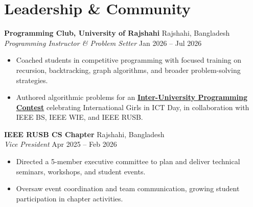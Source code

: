 \documentclass[letterpaper,10pt]{article}
\newcommand{\entrygap}{\vspace{3pt}}
\begin{document}
\section*{Leadership \& Community}
\textbf{Programming Club, University of Rajshahi} \hfill Rajshahi, Bangladesh \\
\textit{Programming Instructor \& Problem Setter} \hfill Jan 2026 -- Jul 2026
\begin{itemize}
    \item Coached students in competitive programming with focused training on recursion, backtracking, graph algorithms, and broader problem-solving strategies.
    \item Authored algorithmic problems for an \href{https://codeforces.com/contestInvitation/77ae2fde9185b7d3d17496824500636617f60686}{\textbf{Inter-University Programming Contest}} celebrating International Girls in ICT Day, in collaboration with IEEE BS, IEEE WIE, and IEEE RUSB.
\end{itemize}
\entrygap
\textbf{IEEE RUSB CS Chapter} \hfill Rajshahi, Bangladesh \\
\textit{Vice President} \hfill Apr 2025 -- Feb 2026
\begin{itemize}
    \item Directed a 5-member executive committee to plan and deliver technical seminars, workshops, and student events.
    \item Oversaw event coordination and team communication, growing student participation in chapter activities.
\end{itemize}
\end{document}
